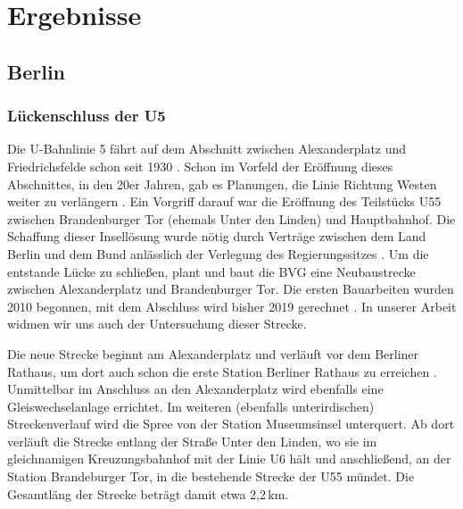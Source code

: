 \chapter{Ergebnisse}

\section{Berlin}
\subsection*{Lückenschluss der U5}

Die U-Bahnlinie 5 fährt auf dem Abschnitt zwischen Alexanderplatz und
Friedrichsfelde schon seit 1930 \cite{bkhU5}. Schon im Vorfeld der Eröffnung
dieses Abschnittes, in den 20er Jahren, gab es Planungen, die Linie Richtung
Westen weiter zu verlängern \cite{bvgWebsiteU5}. Ein Vorgriff darauf war die
Eröffnung des Teilstücks U55 zwischen Brandenburger Tor (ehemals Unter den
Linden) und Hauptbahnhof. Die Schaffung dieser Insellösung wurde nötig durch
Verträge zwischen dem Land Berlin und dem Bund anlässlich der Verlegung des
Regierungssitzes \cite{hauptstadtvertrag}. Um die entstande Lücke zu schließen,
plant und baut die BVG eine Neubaustrecke zwischen Alexanderplatz und
Brandenburger Tor. Die ersten Bauarbeiten wurden 2010 begonnen, mit dem
Abschluss wird bisher 2019 gerechnet \cite{bvgWebsiteU5plan}. In unserer Arbeit
widmen wir uns auch der Untersuchung dieser Strecke.

Die neue Strecke beginnt am Alexanderplatz und verläuft vor dem Berliner
Rathaus, um dort auch schon die erste Station Berliner Rathaus zu erreichen
\cite{bkhU5} \cite{bvgWebsiteU5}. Unmittelbar im Anschluss an den Alexanderplatz
wird ebenfalls eine Gleiswechselanlage errichtet. Im weiteren (ebenfalls
unterirdischen) Streckenverlauf wird die Spree von der Station Museumsinsel
unterquert. Ab dort verläuft die Strecke entlang der Straße Unter den Linden, wo
sie im gleichnamigen Kreuzungsbahnhof mit der Linie U6 hält und anschließend, an
der Station Brandeburger Tor, in die bestehende Strecke der U55 mündet. Die
Gesamtläng der Strecke beträgt damit etwa 2,2\,km.

